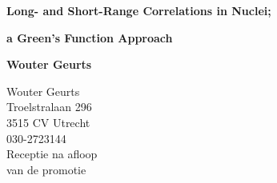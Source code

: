\documentclass[11pt]{proefschrift}
\begin{document}
\pagestyle{empty}
\centerline{\LARGE\bf Long- and Short-Range Correlations in Nuclei;}

\vspace{20pt}
\centerline{\LARGE\bf a Green's Function Approach} 

\begin{center}
\vfill
{}
\vfill
{\LARGE\bf Wouter Geurts} \\
\end{center}
\newpage


\newpage
\evensidemargin 1.5cm
\oddsidemargin 2.5cm

\hspace{1cm}
\begin{center}
\large
\noindent
{\sc Wouter Geurts}\\[\baselineskip]
Troelstralaan 296\\
3515 CV Utrecht\\
030-2723144\\
\vfill
Receptie na afloop\\
van de promotie
\end{center}
\end{document}
